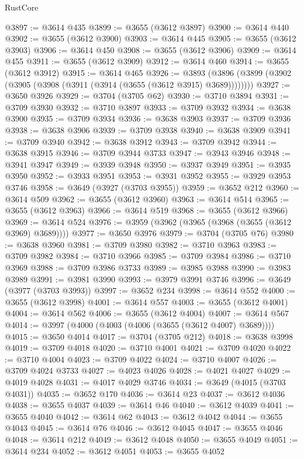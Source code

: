 \begin{lexlean}{RustCore}
\begin{coremodule}
@3897 := @3614 @435
@3899 := @3655 (@3612 @3897)
@3900 := @3614 @440
@3902 := @3655 (@3612 @3900)
@3903 := @3614 @445
@3905 := @3655 (@3612 @3903)
@3906 := @3614 @450
@3908 := @3655 (@3612 @3906)
@3909 := @3614 @455
@3911 := @3655 (@3612 @3909)
@3912 := @3614 @460
@3914 := @3655 (@3612 @3912)
@3915 := @3614 @465
@3926 := @3893 (@3896 (@3899 (@3902 (@3905 (@3908 (@3911 (@3914 (@3655 (@3612 @3915) @3689))))))))
@3927 := @3650 @3926
@3929 := @3704 (@3705 @62)
@3930 := @3710 @3894
@3931 := @3709 @3930
@3932 := @3710 @3897
@3933 := @3709 @3932
@3934 := @3638 @3900
@3935 := @3709 @3934
@3936 := @3638 @3903
@3937 := @3709 @3936
@3938 := @3638 @3906
@3939 := @3709 @3938
@3940 := @3638 @3909
@3941 := @3709 @3940
@3942 := @3638 @3912
@3943 := @3709 @3942
@3944 := @3638 @3915
@3946 := @3709 @3944 @3733
@3947 := @3943 @3946
@3948 := @3941 @3947
@3949 := @3939 @3948
@3950 := @3937 @3949
@3951 := @3935 @3950
@3952 := @3933 @3951
@3953 := @3931 @3952
@3955 := @3929 @3953 @3746
@3958 := @3649 (@3927 (@3703 @3955))
@3959 := @3652 @212
@3960 := @3614 @509
@3962 := @3655 (@3612 @3960)
@3963 := @3614 @514
@3965 := @3655 (@3612 @3963)
@3966 := @3614 @519
@3968 := @3655 (@3612 @3966)
@3969 := @3614 @524
@3976 := @3959 (@3962 (@3965 (@3968 (@3655 (@3612 @3969) @3689))))
@3977 := @3650 @3976
@3979 := @3704 (@3705 @76)
@3980 := @3638 @3960
@3981 := @3709 @3980
@3982 := @3710 @3963
@3983 := @3709 @3982
@3984 := @3710 @3966
@3985 := @3709 @3984
@3986 := @3710 @3969
@3988 := @3709 @3986 @3733
@3989 := @3985 @3988
@3990 := @3983 @3989
@3991 := @3981 @3990
@3993 := @3979 @3991 @3746
@3996 := @3649 (@3977 (@3703 @3993))
@3997 := @3652 @234
@3998 := @3614 @552
@4000 := @3655 (@3612 @3998)
@4001 := @3614 @557
@4003 := @3655 (@3612 @4001)
@4004 := @3614 @562
@4006 := @3655 (@3612 @4004)
@4007 := @3614 @567
@4014 := @3997 (@4000 (@4003 (@4006 (@3655 (@3612 @4007) @3689))))
@4015 := @3650 @4014
@4017 := @3704 (@3705 @212)
@4018 := @3638 @3998
@4019 := @3709 @4018
@4020 := @3710 @4001
@4021 := @3709 @4020
@4022 := @3710 @4004
@4023 := @3709 @4022
@4024 := @3710 @4007
@4026 := @3709 @4024 @3733
@4027 := @4023 @4026
@4028 := @4021 @4027
@4029 := @4019 @4028
@4031 := @4017 @4029 @3746
@4034 := @3649 (@4015 (@3703 @4031))
@4035 := @3652 @170
@4036 := @3614 @23
@4037 := @3612 @4036
@4038 := @3655 @4037
@4039 := @3614 @46
@4040 := @3612 @4039
@4041 := @3655 @4040
@4042 := @3614 @62
@4043 := @3612 @4042
@4044 := @3655 @4043
@4045 := @3614 @76
@4046 := @3612 @4045
@4047 := @3655 @4046
@4048 := @3614 @212
@4049 := @3612 @4048
@4050 := @3655 @4049
@4051 := @3614 @234
@4052 := @3612 @4051
@4053 := @3655 @4052

\end{coremodule}
\end{lexlean}
